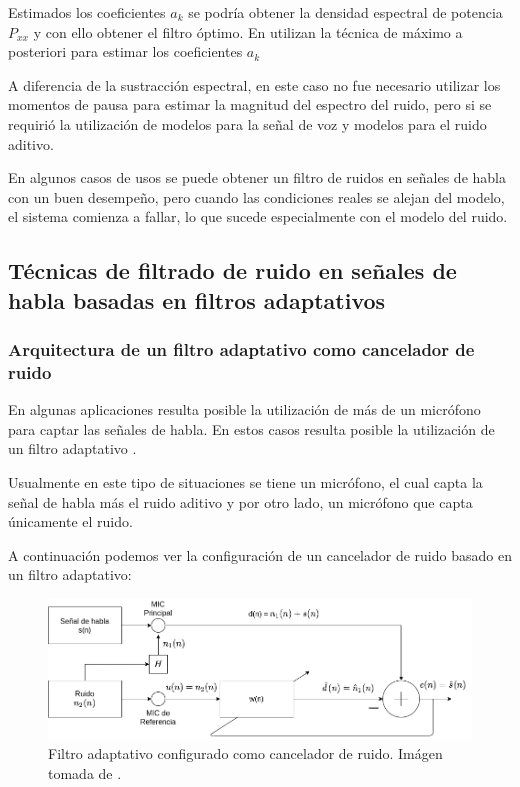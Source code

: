 Estimados los coeficientes $a_k$ se podría obtener la densidad espectral de potencia $P_{xx}$ y con ello obtener el filtro óptimo. En \cite{all_pole_modeling_of_degraded_speech} utilizan la técnica de máximo a posteriori para estimar los coeficientes $a_k$

A diferencia de la sustracción espectral, en este caso no fue necesario utilizar los momentos de pausa para estimar la magnitud del espectro del ruido, pero si se requirió la utilización de modelos para la señal de voz y modelos para el ruido aditivo. 

En algunos casos de usos se puede obtener un filtro de ruidos en señales de habla con un buen desempeño, pero cuando las condiciones reales se alejan del modelo, el sistema comienza a fallar, lo que sucede especialmente con el modelo del ruido.

\subsection{Técnicas de filtrado de ruido en señales de habla basadas en filtros adaptativos}
\label{sec:adaptive_filter}

\subsubsection{Arquitectura de un filtro adaptativo como cancelador de ruido}
\label{sec:adaptive_filter_architecture}

En algunas aplicaciones resulta posible la utilización de más de un micrófono para captar las señales de habla. En estos casos resulta posible la utilización de un filtro adaptativo \cite{fundamentals_of_adaptive_filtering}.

Usualmente en este tipo de situaciones se tiene un micrófono, el cual capta la señal de habla más el ruido aditivo y por otro lado, un micrófono que capta únicamente el ruido.

A continuación podemos ver la configuración de un cancelador de ruido basado en un filtro adaptativo:

\begin{figure}[H]
	\centering
	\centerline{\includegraphics[scale=0.5]{images/ch3/af-se-setup.png}}
	\caption{Filtro adaptativo configurado como cancelador de ruido. Imágen tomada de \cite{a_family_of_adaptive_filter_slgorithms_in_noise_cancellation_for_speech_enhancement}.}
	\label{fig:ch3_af-se-setup}
\end{figure}

